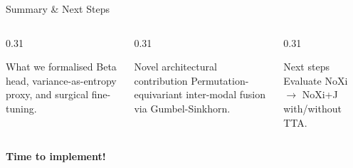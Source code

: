 \documentclass[aspectratio=169]{beamer}
\begin{document}
	\begin{frame}{Summary \& Next Steps}
		\begin{columns}[onlytextwidth]
			\begin{column}{0.31\textwidth}
				\begin{block}{What we formalised}
					\small Beta head, variance-as-entropy proxy, and surgical fine-tuning.
				\end{block}
			\end{column}
			\begin{column}{0.31\textwidth}
				\begin{block}{Novel architectural contribution}
					\small Permutation-equivariant inter-modal fusion via Gumbel-Sinkhorn.
				\end{block}
			\end{column}
			\begin{column}{0.31\textwidth}
				\begin{block}{Next steps}
					\small Evaluate NoXi $\to$ NoXi+J with/without TTA.
				\end{block}
			\end{column}
		\end{columns}
		\vspace{1em}
		\begin{center}
			\Large\bfseries\color{coolpurple} Time to implement!
		\end{center}
	\end{frame}
	
\end{document}
